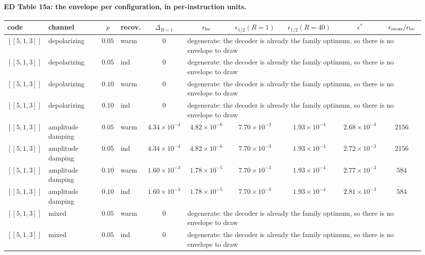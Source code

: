 \documentclass[10pt,a4paper]{article}
\begin{document}
\paragraph*{ED Table 15a: the envelope per configuration, in per-instruction units.}
\begin{longtable}{llclcccccc}
\toprule code & channel & $p$ & recov. & $\Delta_{R=1}$ & $\epsilon_{\rm be}$ & $\epsilon_{1/2}(R{=}1)$ & $\epsilon_{1/2}(R{=}40)$ & $\epsilon^*$ & $\epsilon_{\rm meas}/\epsilon_{\rm be}$ \\ \midrule
$[\![5,1,3]\!]$ & depolarizing & $0.05$ & warm & $0$ & \multicolumn{5}{l}{degenerate: the decoder is already the family optimum, so there is no envelope to draw} \\
$[\![5,1,3]\!]$ & depolarizing & $0.05$ & ind & $0$ & \multicolumn{5}{l}{degenerate: the decoder is already the family optimum, so there is no envelope to draw} \\
$[\![5,1,3]\!]$ & depolarizing & $0.10$ & warm & $0$ & \multicolumn{5}{l}{degenerate: the decoder is already the family optimum, so there is no envelope to draw} \\
$[\![5,1,3]\!]$ & depolarizing & $0.10$ & ind & $0$ & \multicolumn{5}{l}{degenerate: the decoder is already the family optimum, so there is no envelope to draw} \\
$[\![5,1,3]\!]$ & amplitude damping & $0.05$ & warm & $4.34\times 10^{-4}$ & $4.82\times 10^{-6}$ & $7.70\times 10^{-3}$ & $1.93\times 10^{-4}$ & $2.68\times 10^{-3}$ & $2156$ \\
$[\![5,1,3]\!]$ & amplitude damping & $0.05$ & ind & $4.34\times 10^{-4}$ & $4.82\times 10^{-6}$ & $7.70\times 10^{-3}$ & $1.93\times 10^{-4}$ & $2.72\times 10^{-3}$ & $2156$ \\
$[\![5,1,3]\!]$ & amplitude damping & $0.10$ & warm & $1.60\times 10^{-3}$ & $1.78\times 10^{-5}$ & $7.70\times 10^{-3}$ & $1.93\times 10^{-4}$ & $2.77\times 10^{-3}$ & $584$ \\
$[\![5,1,3]\!]$ & amplitude damping & $0.10$ & ind & $1.60\times 10^{-3}$ & $1.78\times 10^{-5}$ & $7.70\times 10^{-3}$ & $1.93\times 10^{-4}$ & $2.81\times 10^{-3}$ & $584$ \\
$[\![5,1,3]\!]$ & mixed & $0.05$ & warm & $0$ & \multicolumn{5}{l}{degenerate: the decoder is already the family optimum, so there is no envelope to draw} \\
$[\![5,1,3]\!]$ & mixed & $0.05$ & ind & $0$ & \multicolumn{5}{l}{degenerate: the decoder is already the family optimum, so there is no envelope to draw} \\

\end{longtable}
\end{document}
